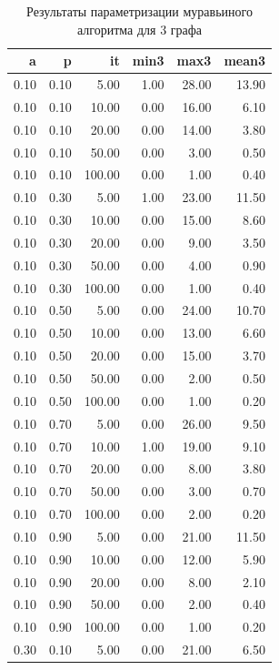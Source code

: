 \documentclass{bmstu}
\begin{document}
\begin{longtable}{|r|r|r|r|r|r|}
\caption{Результаты параметризации муравьиного алгоритма для 3 графа}
\label{two}
\hline
a & p & it & min3 & max3 & mean3 \\ \hline
0.10 & 0.10 & 5.00 & 1.00 & 28.00 & 13.90 \\ \hline
0.10 & 0.10 & 10.00 & 0.00 & 16.00 & 6.10 \\ \hline
0.10 & 0.10 & 20.00 & 0.00 & 14.00 & 3.80 \\ \hline
0.10 & 0.10 & 50.00 & 0.00 & 3.00 & 0.50 \\ \hline
0.10 & 0.10 & 100.00 & 0.00 & 1.00 & 0.40 \\ \hline
0.10 & 0.30 & 5.00 & 1.00 & 23.00 & 11.50 \\ \hline
0.10 & 0.30 & 10.00 & 0.00 & 15.00 & 8.60 \\ \hline
0.10 & 0.30 & 20.00 & 0.00 & 9.00 & 3.50 \\ \hline
0.10 & 0.30 & 50.00 & 0.00 & 4.00 & 0.90 \\ \hline
0.10 & 0.30 & 100.00 & 0.00 & 1.00 & 0.40 \\ \hline
0.10 & 0.50 & 5.00 & 0.00 & 24.00 & 10.70 \\ \hline
0.10 & 0.50 & 10.00 & 0.00 & 13.00 & 6.60 \\ \hline
0.10 & 0.50 & 20.00 & 0.00 & 15.00 & 3.70 \\ \hline
0.10 & 0.50 & 50.00 & 0.00 & 2.00 & 0.50 \\ \hline
0.10 & 0.50 & 100.00 & 0.00 & 1.00 & 0.20 \\ \hline
0.10 & 0.70 & 5.00 & 0.00 & 26.00 & 9.50 \\ \hline
0.10 & 0.70 & 10.00 & 1.00 & 19.00 & 9.10 \\ \hline
0.10 & 0.70 & 20.00 & 0.00 & 8.00 & 3.80 \\ \hline
0.10 & 0.70 & 50.00 & 0.00 & 3.00 & 0.70 \\ \hline
0.10 & 0.70 & 100.00 & 0.00 & 2.00 & 0.20 \\ \hline
0.10 & 0.90 & 5.00 & 0.00 & 21.00 & 11.50 \\ \hline
0.10 & 0.90 & 10.00 & 0.00 & 12.00 & 5.90 \\ \hline
0.10 & 0.90 & 20.00 & 0.00 & 8.00 & 2.10 \\ \hline
0.10 & 0.90 & 50.00 & 0.00 & 2.00 & 0.40 \\ \hline
0.10 & 0.90 & 100.00 & 0.00 & 1.00 & 0.20 \\ \hline
0.30 & 0.10 & 5.00 & 0.00 & 21.00 & 6.50 \\ \hline

\end{longtable}
\end{document}

